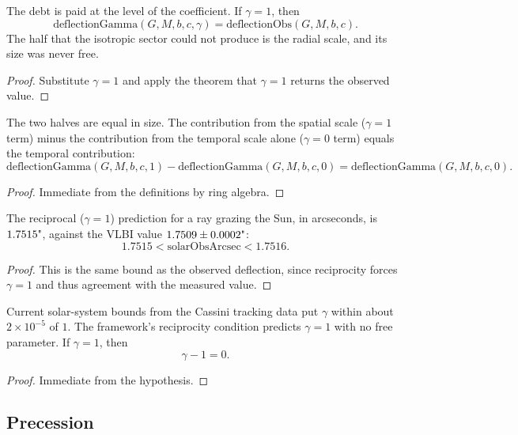 \begin{theorem}
The debt is paid at the level of the coefficient. If $\gamma = 1$, then
\[
\text{deflectionGamma}(G, M, b, c, \gamma) = \text{deflectionObs}(G, M, b, c).
\]
The half that the isotropic sector could not produce is the radial scale, and its size was never free.
\begin{proof}
Substitute $\gamma = 1$ and apply the theorem that $\gamma = 1$ returns the observed value.
\end{proof}
\end{theorem}

\begin{theorem}
The two halves are equal in size. The contribution from the spatial scale ($\gamma = 1$ term) minus the contribution from the temporal scale alone ($\gamma = 0$ term) equals the temporal contribution:
\[
\text{deflectionGamma}(G, M, b, c, 1) - \text{deflectionGamma}(G, M, b, c, 0) = \text{deflectionGamma}(G, M, b, c, 0).
\]
\begin{proof}
Immediate from the definitions by ring algebra.
\end{proof}
\end{theorem}

\begin{theorem}
The reciprocal ($\gamma = 1$) prediction for a ray grazing the Sun, in arcseconds, is $1.7515 \text{\textquotedbl}$, against the VLBI value $1.7509 \pm 0.0002 \text{\textquotedbl}$:
\[
1.7515 < \text{solarObsArcsec} < 1.7516.
\]
\begin{proof}
This is the same bound as the observed deflection, since reciprocity forces $\gamma = 1$ and thus agreement with the measured value.
\end{proof}
\end{theorem}

\begin{theorem}
Current solar-system bounds from the Cassini tracking data put $\gamma$ within about $2 \times 10^{-5}$ of $1$. The framework's reciprocity condition predicts $\gamma = 1$ with no free parameter. If $\gamma = 1$, then
\[
\gamma - 1 = 0.
\]
\begin{proof}
Immediate from the hypothesis.
\end{proof}
\end{theorem}

\subsection{Precession}


